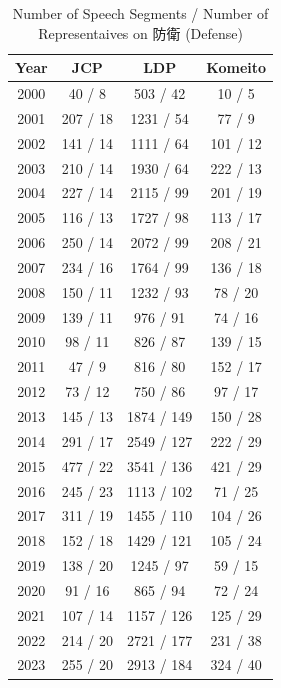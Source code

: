 \documentclass[final,5p,times,twocolumn,authoryear]{elsarticle}
\begin{document}
\begin{table}[h]
\begin{CJK}{UTF8}{min}

    \centering
    \begin{tabular}{c|ccc}
        \hline
        Year & JCP & LDP & Komeito \\
        \hline
        2000 & 40 / 8 & 503 / 42 & 10 / 5 \\
        2001 & 207 / 18 & 1231 / 54 & 77 / 9 \\
        2002 & 141 / 14 & 1111 / 64 & 101 / 12 \\
        2003 & 210 / 14 & 1930 / 64 & 222 / 13 \\
        2004 & 227 / 14 & 2115 / 99 & 201 / 19 \\
        2005 & 116 / 13 & 1727 / 98 & 113 / 17 \\
        2006 & 250 / 14 & 2072 / 99 & 208 / 21 \\
        2007 & 234 / 16 & 1764 / 99 & 136 / 18 \\
        2008 & 150 / 11 & 1232 / 93 & 78 / 20 \\
        2009 & 139 / 11 & 976 / 91 & 74 / 16 \\
        2010 & 98 / 11 & 826 / 87 & 139 / 15 \\
        2011 & 47 / 9 & 816 / 80 & 152 / 17 \\
        2012 & 73 / 12 & 750 / 86 & 97 / 17 \\
        2013 & 145 / 13 & 1874 / 149 & 150 / 28 \\
        2014 & 291 / 17 & 2549 / 127 & 222 / 29 \\
        2015 & 477 / 22 & 3541 / 136 & 421 / 29 \\
        2016 & 245 / 23 & 1113 / 102 & 71 / 25 \\
        2017 & 311 / 19 & 1455 / 110 & 104 / 26 \\
        2018 & 152 / 18 & 1429 / 121 & 105 / 24 \\
        2019 & 138 / 20 & 1245 / 97 & 59 / 15 \\
        2020 & 91 / 16 & 865 / 94 & 72 / 24 \\
        2021 & 107 / 14 & 1157 / 126 & 125 / 29 \\
        2022 & 214 / 20 & 2721 / 177 & 231 / 38 \\
        2023 & 255 / 20 & 2913 / 184 & 324 / 40 \\
        \hline
    \end{tabular}
    \caption{Number of Speech Segments / Number of Representaives on 防衛 (Defense)}
    \label{tab:defense_speech}
	\end{CJK}
\end{table}
\end{document}
